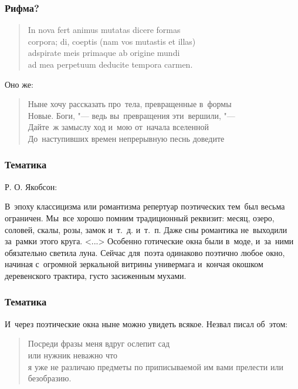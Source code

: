 \documentclass{beamer}
\begin{document}

\begin{frame}
\frametitle{Рифма?}

\begin{verse}
In nova fert animus mutatas dicere formas\\
corpora; di, coeptis (nam vos mutastis et illas)\\
adspirate meis primaque ab origine mundi\\
ad mea perpetuum deducite tempora carmen.
\end{verse}

\begin{center}
Оно же:
\end{center}

\begin{verse}
Ныне хочу рассказать про~тела, превращенные в~формы\\
Новые. Боги, "--- ведь  вы~превращения эти~вершили, "---\\
Дайте~ж замыслу ход и~мою от~начала вселенной\\
До~наступивших времен непрерывную песнь доведите
\end{verse}

\end{frame}


\begin{frame}
\frametitle{Тематика}

Р. О. Якобсон:

В~эпоху классицизма или романтизма репертуар поэтических тем~был весьма ограничен. Мы~все хорошо помним традиционный реквизит: месяц, озеро, соловей, скалы, розы, замок и~т.~д. и~т.~п. Даже сны романтика не~выходили за~рамки этого круга. <...>  Особенно готические окна были в~моде, и~за~ними обязательно светила луна. Сейчас для~поэта одинаково поэтично любое окно, начиная с~огромной зеркальной витрины универмага и~кончая окошком деревенского трактира, густо засиженным мухами. 

\end{frame}


\begin{frame}
\frametitle{Тематика}

И~через поэтические окна ныне можно увидеть всякое. Незвал писал об~этом:

\begin{verse}
Посреди фразы меня вдруг ослепит сад\\
или нужник неважно что\\
я уже не различаю предметы по приписываемой им вами прелести или\\
безобразию.
\end{verse}


\end{frame}
\end{document}
